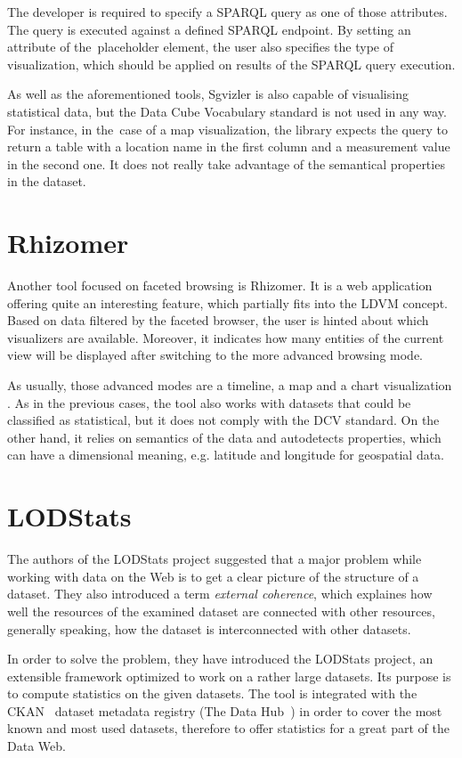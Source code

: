 The developer is required to specify a SPARQL query as one of those attributes. The 
query is executed against a defined SPARQL endpoint. By setting an attribute of
the~placeholder element, the user also specifies the type of visualization, which 
should be applied on results of the SPARQL query execution.

As well as the aforementioned tools, Sgvizler is also capable of visualising statistical data, 
but the Data Cube Vocabulary standard is not used in any way. For instance, in 
the~case of a map visualization, the library expects the query to return a table 
with a location name in the first column and a measurement value in the second 
one. It does not really take advantage of the semantical properties in the 
dataset.

\section{Rhizomer}
Another tool focused on faceted browsing is Rhizomer. It is a web application 
offering quite an interesting feature, which partially fits into the LDVM 
concept. Based on data filtered by the faceted browser, the user is hinted about
which visualizers are available. Moreover, 
it indicates how many entities of the current view will be displayed after 
switching to the more advanced browsing mode.

As usually, those advanced modes are a timeline, a map and a chart visualization . As 
in the previous cases, the tool also works with datasets that could be 
classified as statistical, but it does not comply with the DCV standard. On the 
other hand, it relies on semantics of the data and autodetects properties, 
which can have a dimensional meaning, e.g. latitude and longitude for geospatial data.

\section{LODStats}
The authors of the LODStats project suggested that a major 
problem while working with data on the Web is to get a clear picture of the 
structure of a dataset. They also introduced a term \emph{external coherence},
which explaines how well the resources of the examined dataset are connected with 
other resources, generally speaking, how the dataset is interconnected with 
other datasets.

In order to solve the problem, they have introduced the LODStats project, an 
extensible framework optimized to work on a rather large datasets. Its purpose 
is to compute statistics on the given datasets. The tool is integrated with the 
CKAN~\cite{ckan} dataset metadata registry (The Data Hub~\cite{thedatahub})
in order to cover the most known and 
most used datasets, therefore to offer statistics for a great part of the Data 
Web.

